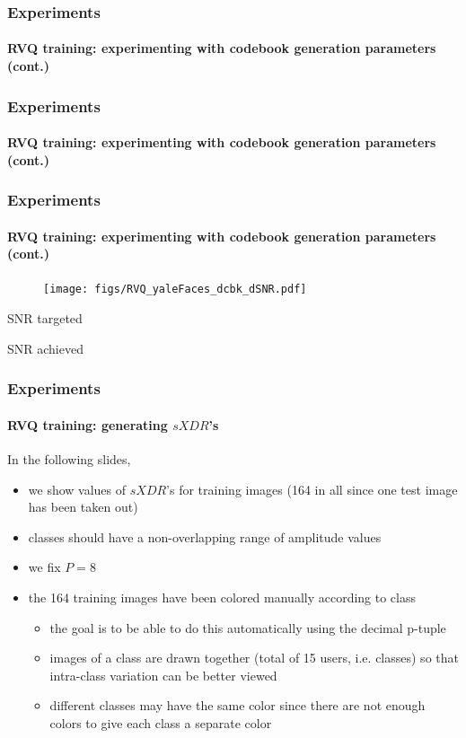 \begin{frame}
\frametitle{Experiments}
\framesubtitle{RVQ training: experimenting with codebook generation parameters (cont.)}
\mypagenum	
\end{frame}


\begin{frame}
\frametitle{Experiments}
\framesubtitle{RVQ training: experimenting with codebook generation parameters (cont.)}
\mypagenum	
\end{frame}


\begin{frame}[plain]
\frametitle{Experiments}
\framesubtitle{RVQ training: experimenting with codebook generation parameters (cont.)}
\mypagenum
	\begin{changemargin}{-0.7in}{0in}	
		\begin{figure}
			\texttt{[image: figs/RVQ\_yaleFaces\_dcbk\_dSNR.pdf]}
		\end{figure}
		\tiny SNR targeted
		\begin{tiny}
		 
		\end{tiny}		
		\tiny SNR achieved
		\begin{tiny}
		 
		\end{tiny}
	\end{changemargin}
\end{frame}


\begin{frame}
\frametitle{Experiments}
\framesubtitle{RVQ training: generating $sXDR$'s}
\logoCSIPCPL\mypagenum
	In the following slides,
	\begin{itemize}
		\item we show values of $sXDR$'s for training images (164 in all since one test image has been taken out) 
		\item classes should have a non-overlapping range of amplitude values
		\item we fix $P=8$
		\item the 164 training images have been colored {\color{blue}manually} according to class
			\begin{itemize}
				\item the goal is to be able to do this {\color{blue}automatically} using the decimal p-tuple
				\item images of a class are drawn together (total of 15 users, i.e. classes) so that intra-class variation can be better viewed
				\item different classes may have the same color since there are not enough colors to give each class a separate color
			\end{itemize}
	\end{itemize}
\end{frame}




